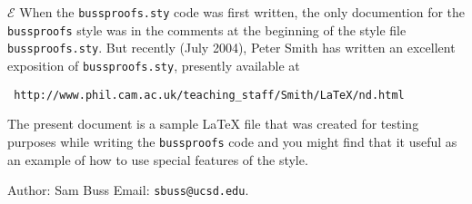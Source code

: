 \documentclass[12pt]{article}
\begin{document}
\thispagestyle{empty}
$\mathcal{E}$
When the {\tt bussproofs.sty} code was first written, the
only documention for the {\tt bussproofs} style was in the
comments at the beginning of the style file {\tt bussproofs.sty}.
But recently (July 2004), Peter Smith has written an excellent
exposition of {\tt bussproofs.sty}, presently available
at
\begin{center}
\tt
http://www.phil.cam.ac.uk/teaching\_staff/Smith/LaTeX/nd.html
\end{center}

The present document is
a sample \LaTeX{} file that was created for testing
purposes while writing the {\tt bussproofs} code and you might
find that it useful as an example of how to
use special features of the style.

Author: Sam Buss \hspace*{1in} Email: {\tt sbuss@ucsd.edu}.
\vspace*{0.25in}
\end{document}
